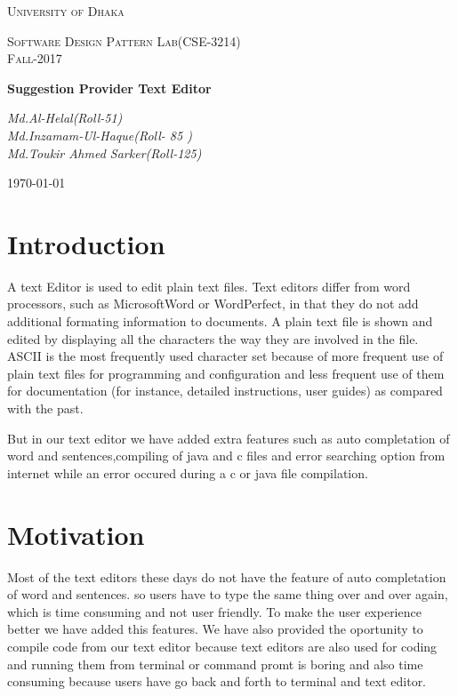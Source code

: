 \documentclass[a4paper]{article}
\begin{document}
\begin{titlepage}
\centering
{\scshape\LARGE University of Dhaka \par}
\vspace{1cm}
\vfill
{\scshape\Large Software Design Pattern Lab(CSE-3214)\\Fall-2017\par}
\vspace{1.5cm}
\vfill
{\huge\bfseries Suggestion Provider Text Editor\par}
\vspace{2cm}
\vfill
{\Large\itshape Md.Al-Helal(Roll-51)\\Md.Inzamam-Ul-Haque(Roll- 85 )\\Md.Toukir Ahmed Sarker(Roll-125)\par}
\vfill
{\large \today\par}
\end{titlepage}

\section{Introduction}
A text Editor is used to edit plain text files. Text editors differ from word processors, such as MicrosoftWord or WordPerfect, in that they do not add additional formating information to documents. A plain text file is shown and edited by displaying all the characters the way they are involved in the file. ASCII is the most frequently used character set because of more frequent use of plain text files for programming and configuration and less frequent use of them for documentation (for instance, detailed instructions, user guides) as compared with the past. 

But in our text editor we have added extra features such as auto completation of word and sentences,compiling of java and c files and error searching option from internet while an error occured during a c or java file compilation.
\section{Motivation}

Most of the text editors these days do not have the feature of auto completation of word and sentences. so users have to type the same thing over and over again, which is time consuming and not user friendly. To make the user experience better we have added this features. We have also provided the oportunity to compile code from our text editor because text editors are also used for coding and running them from terminal or command promt is boring and also time consuming because users have go back and forth to terminal and text editor.
\end{document}
